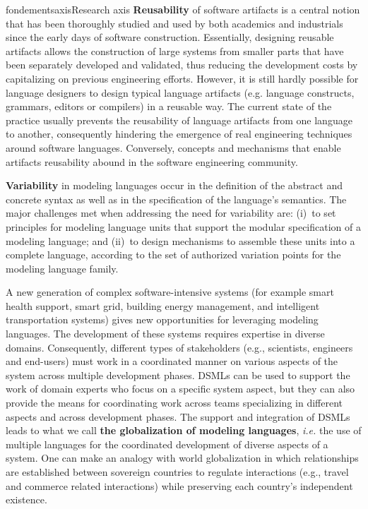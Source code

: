 \documentclass{ra2018}
\begin{document}
\begin{module}{fondements}{axis}{Research axis}
\textbf{Reusability} of software artifacts is a central notion that has been thoroughly studied and used by both academics and industrials since the early days of software construction. Essentially, designing reusable artifacts allows the construction of large systems from smaller parts that have been separately developed and validated, thus reducing the development costs by capitalizing on previous engineering efforts.
%
However, it is still hardly possible for language designers to design typical language artifacts (e.g. language constructs, grammars, editors or compilers) in a reusable way. The current state of the practice usually prevents the reusability of language artifacts from one language to another, consequently hindering the emergence of real engineering techniques around software languages.
Conversely, concepts and mechanisms that enable artifacts reusability abound in the software engineering community. 

\textbf{Variability} in modeling languages occur in the definition of the abstract and concrete syntax as well as in the specification of the language's semantics. 
The major challenges met when addressing the need for variability are: (i)~to set principles for modeling language units that support the modular specification of a modeling language; and (ii)~to design mechanisms to assemble these units into a complete language, according to the set of authorized variation points for the modeling language family.


A new generation of complex software-intensive systems (for example smart health support, smart grid, building energy management, and intelligent transportation systems) gives new opportunities for leveraging modeling languages. The development of these systems requires expertise in diverse domains.
Consequently, different types of stakeholders (e.g., scientists, engineers and end-users) must work in a coordinated manner on various aspects of the system across multiple development phases. DSMLs can be used to support the work of domain experts who focus on a specific system aspect, but they can also provide the means for coordinating work across teams specializing in different aspects and across development phases. The support and integration of DSMLs leads to what we call \textbf{the globalization of modeling languages}, \textit{i.e.} the use of multiple languages for the coordinated development of diverse aspects of a system. One can make an analogy with world globalization in which relationships are established between sovereign countries to regulate interactions (e.g., travel and commerce related interactions) while preserving each country's independent existence.



\end{module}
\end{document}
